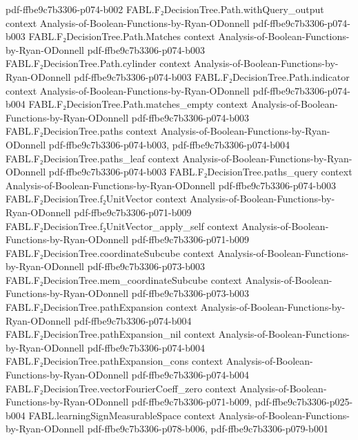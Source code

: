 \begin{theorem}
  {pdf-ffbe9c7b3306-p074-b002}
\proofstep
  {FABL.F₂DecisionTree.Path.withQuery_output}
  {context}
  {Analysis-of-Boolean-Functions-by-Ryan-ODonnell}
  {pdf-ffbe9c7b3306-p074-b003}
\proofstep
  {FABL.F₂DecisionTree.Path.Matches}
  {context}
  {Analysis-of-Boolean-Functions-by-Ryan-ODonnell}
  {pdf-ffbe9c7b3306-p074-b003}
\proofstep
  {FABL.F₂DecisionTree.Path.cylinder}
  {context}
  {Analysis-of-Boolean-Functions-by-Ryan-ODonnell}
  {pdf-ffbe9c7b3306-p074-b003}
\proofstep
  {FABL.F₂DecisionTree.Path.indicator}
  {context}
  {Analysis-of-Boolean-Functions-by-Ryan-ODonnell}
  {pdf-ffbe9c7b3306-p074-b004}
\proofstep
  {FABL.F₂DecisionTree.Path.matches_empty}
  {context}
  {Analysis-of-Boolean-Functions-by-Ryan-ODonnell}
  {pdf-ffbe9c7b3306-p074-b003}
\proofstep
  {FABL.F₂DecisionTree.paths}
  {context}
  {Analysis-of-Boolean-Functions-by-Ryan-ODonnell}
  {pdf-ffbe9c7b3306-p074-b003,
    pdf-ffbe9c7b3306-p074-b004}
\proofstep
  {FABL.F₂DecisionTree.paths_leaf}
  {context}
  {Analysis-of-Boolean-Functions-by-Ryan-ODonnell}
  {pdf-ffbe9c7b3306-p074-b003}
\proofstep
  {FABL.F₂DecisionTree.paths_query}
  {context}
  {Analysis-of-Boolean-Functions-by-Ryan-ODonnell}
  {pdf-ffbe9c7b3306-p074-b003}
\proofstep
  {FABL.F₂DecisionTree.f₂UnitVector}
  {context}
  {Analysis-of-Boolean-Functions-by-Ryan-ODonnell}
  {pdf-ffbe9c7b3306-p071-b009}
\proofstep
  {FABL.F₂DecisionTree.f₂UnitVector_apply_self}
  {context}
  {Analysis-of-Boolean-Functions-by-Ryan-ODonnell}
  {pdf-ffbe9c7b3306-p071-b009}
\proofstep
  {FABL.F₂DecisionTree.coordinateSubcube}
  {context}
  {Analysis-of-Boolean-Functions-by-Ryan-ODonnell}
  {pdf-ffbe9c7b3306-p073-b003}
\proofstep
  {FABL.F₂DecisionTree.mem_coordinateSubcube}
  {context}
  {Analysis-of-Boolean-Functions-by-Ryan-ODonnell}
  {pdf-ffbe9c7b3306-p073-b003}
\proofstep
  {FABL.F₂DecisionTree.pathExpansion}
  {context}
  {Analysis-of-Boolean-Functions-by-Ryan-ODonnell}
  {pdf-ffbe9c7b3306-p074-b004}
\proofstep
  {FABL.F₂DecisionTree.pathExpansion_nil}
  {context}
  {Analysis-of-Boolean-Functions-by-Ryan-ODonnell}
  {pdf-ffbe9c7b3306-p074-b004}
\proofstep
  {FABL.F₂DecisionTree.pathExpansion_cons}
  {context}
  {Analysis-of-Boolean-Functions-by-Ryan-ODonnell}
  {pdf-ffbe9c7b3306-p074-b004}
\proofstep
  {FABL.F₂DecisionTree.vectorFourierCoeff_zero}
  {context}
  {Analysis-of-Boolean-Functions-by-Ryan-ODonnell}
  {pdf-ffbe9c7b3306-p071-b009,
    pdf-ffbe9c7b3306-p025-b004}
\proofstep
  {FABL.learningSignMeasurableSpace}
  {context}
  {Analysis-of-Boolean-Functions-by-Ryan-ODonnell}
  {pdf-ffbe9c7b3306-p078-b006,
    pdf-ffbe9c7b3306-p079-b001}
\proofstep

\end{theorem}
